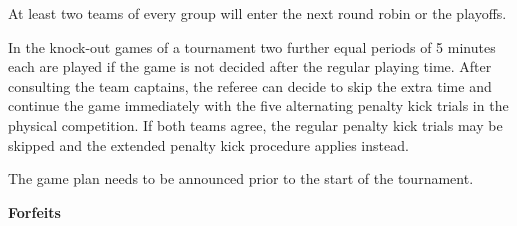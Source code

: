 \bigskip


At least two teams of every group will enter the next round robin or the playoffs.

\bigskip

In the knock-out games of a tournament two further equal periods of 5 minutes each are played if the game is not decided after the regular playing time.  After consulting the team captains, the referee can decide to skip the extra time and continue the game immediately with the five alternating penalty kick trials in the physical competition. If both teams agree, the regular penalty kick trials may be skipped and the extended penalty kick procedure applies instead.

\bigskip


The game plan needs to be announced prior to the start of the tournament.


\bigskip

{\bfseries Forfeits}

\headlinebox

